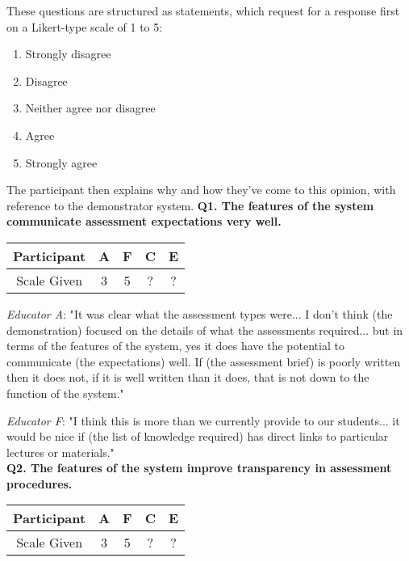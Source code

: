 These questions are structured as statements, which request for a response first on a Likert-type scale of 1 to 5:
\begin{enumerate}
	\setlength\itemsep{0em}
	\item Strongly disagree
	\item Disagree
	\item Neither agree nor disagree
	\item Agree
	\item Strongly agree
\end{enumerate}
The participant then explains why and how they've come to this opinion, with reference to the demonstrator system.
\newpage
\textbf{Q1. The features of the system communicate assessment expectations very well.}\\
\begin{table}[!ht]
	\centering
	\begin{tabular}{|c|c|c|c|c|}
		\hline
		Participant & A                       & F                   & C & E \\
		\hline
		Scale Given & \cellcolor{Dandelion} 3 & \cellcolor{green} 5 & ? & ? \\
		\hline
	\end{tabular}
\end{table}

\textit{Educator A}: "It was clear what the assessment types were... I don't think (the demonstration)
focused on the details of what the assessments required... but in terms of the features of the system,
yes it does have the potential to communicate (the expectations) well. If (the assessment brief) is
poorly written then it does not, if it is well written than it does, that is not down to the function of the system."

\textit{Educator F}: "I think this is more than we currently provide to our students... it would be nice if
(the list of knowledge required) has direct links to particular lectures or materials."\\

\textbf{Q2. The features of the system improve transparency in assessment procedures.}\\
\begin{table}[!ht]
	\centering
	\begin{tabularx}{0.325\textwidth}{|c|c|c|c|c|}
		\hline
		Participant & A                      & F                  & C & E \\
		\hline
		Scale Given & \cellcolor{Dandelion}3 & \cellcolor{green}5 & ? & ? \\
		\hline
	\end{tabularx}
\end{table}

